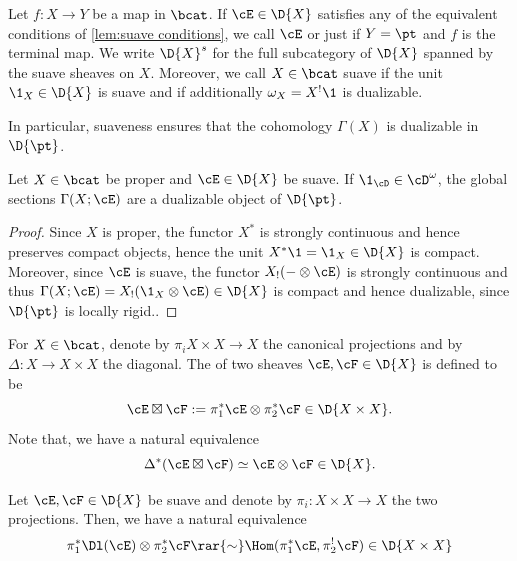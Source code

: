 \begin{defn}
  Let $f\colon X\to Y$ be a map in $\bcat$. If $\cE\in \D{X}$ satisfies any of the
  equivalent conditions of \cref{lem:suave conditions}, we call $\cE$  or just
   if $Y=\pt$ and $f$ is the terminal map. We write $\D{X}^{s}$ for the
  full subcategory of $\D{X}$ spanned by the suave sheaves on $X$. Moreover, we
  call $X\in \bcat$ suave if the unit $\1_{X}\in \D{X}$ is suave and 
  if additionally $\omega_{X}=X^{!}\1$ is dualizable.
\end{defn}

In particular, suaveness ensures that the cohomology $\Gamma(X)$ is dualizable in $\D{\pt}$.


\begin{prop}\label{prop: sections dualizable}
  Let $X\in \bcat$ be proper and $\cE\in \D{X}$ be suave. If $\1_{\cD}\in \cD^{\omega}$,
  the global sections $\Gamma(X;\cE)$ are a dualizable object of $\D{\pt}$.
\end{prop}
\begin{proof}
  Since $X$ is proper, the functor $X^{\ast}$ is strongly continuous and hence
  preserves compact objects, hence the unit $X^{\ast}\1=\1_{X}\in \D{X}$ is
  compact. Moreover, since $\cE$ is suave, the functor $X_{!}(-\otimes \cE)$
  is strongly continuous and thus $\Gamma(X;\cE)=X_{!}(\1_{X}\otimes \cE)\in \D{X}$
  is compact and hence dualizable, since $\D{\pt}$ is locally rigid..
\end{proof}

For $X\in \bcat$, denote by $\pi_{i}X\times X\to X$ the canonical projections and by
$\Delta\colon X \to X\times X$ the diagonal. The 
of two sheaves $\cE,\cF\in \D{X}$ is defined to be
\[ \cE\boxtimes \cF := \pi_{1}^{\ast}\cE \otimes \pi_{2}^{\ast}\cF \in \D{X\times X}.\]
Note that, we have a natural equivalence
\[ \Delta^{\ast}(\cE\boxtimes \cF)\simeq \cE\otimes \cF\in \D{X}.\]

\begin{prop}\label{prop: external hom}
Let $\cE,\cF\in \D{X}$ be suave and denote by $\pi_{i}\colon X\times X \to X$ the two projections.
Then, we have a natural equivalence
\[ \pi_{1}^{\ast}\Dl(\cE)\otimes \pi_{2}^{\ast}\cF \rar{\sim} \Hom(\pi_{1}^{\ast}\cE, \pi_{2}^{!}\cF)\in \D{X\times X}\]
\end{prop}

